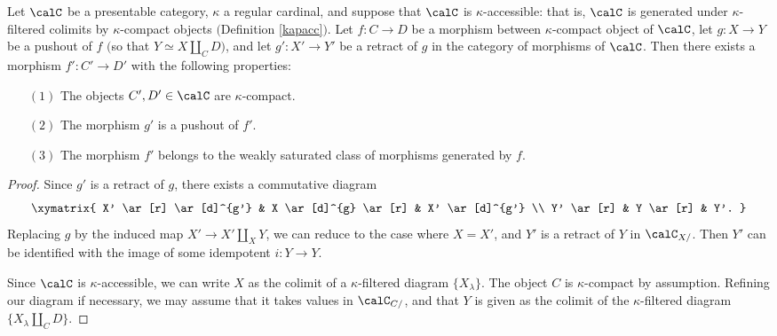 \begin{CategoryTheory}
\begin{Didn't Read}
\begin{lemma}\label{tirun}
Let $\calC$ be a presentable category, $\kappa$ a regular cardinal, and suppose that $\calC$ is $\kappa$-accessible: that is, $\calC$ is generated under $\kappa$-filtered colimits by $\kappa$-compact objects $($Definition \ref{kapacc}$)$. Let $f: C \rightarrow D$ be a morphism between $\kappa$-compact object of $\calC$, let
$g: X \rightarrow Y$ be a pushout of $f$ $($so that $Y \simeq X \coprod_{C} D${}$)$, and let
$g': X' \rightarrow Y'$ be a retract of $g$ in the category of morphisms of $\calC$.
Then there exists a morphism $f': C' \rightarrow D'$ with the following properties:
\begin{itemize}
\item[$(1)$] The objects $C', D' \in \calC$ are $\kappa$-compact.
\item[$(2)$] The morphism $g'$ is a pushout of $f'$.
\item[$(3)$] The morphism $f'$ belongs to the weakly saturated class of morphisms generated by $f$.
\end{itemize}
\end{lemma}

\begin{proof}
Since $g'$ is a retract of $g$, there exists a commutative diagram
$$ \xymatrix{ X' \ar[r] \ar[d]^{g'} & X \ar[d]^{g} \ar[r] & X' \ar[d]^{g'} \\
Y' \ar[r] & Y \ar[r] & Y'. }$$
Replacing $g$ by the induced map $X' \rightarrow X' \coprod_{X} Y$, we can reduce to the case
where $X = X'$, and $Y'$ is a retract of $Y$ in $\calC_{X/}$. Then $Y'$ can be identified with
the image of some idempotent $i: Y \rightarrow Y$. 

Since $\calC$ is $\kappa$-accessible, we can write $X$ as the colimit of a $\kappa$-filtered
diagram $\{ X_{\lambda} \}$. The object $C$ is $\kappa$-compact by assumption. Refining our diagram if necessary, we may assume that it takes values in $\calC_{C/}$, and that $Y$ is
given as the colimit of the $\kappa$-filtered diagram $\{ X_{\lambda} \coprod_{C} D \}$. 


\end{proof}
\end{Didn't Read}
\end{CategoryTheory}
